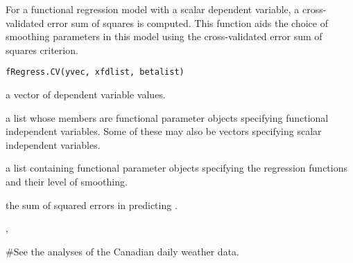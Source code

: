 \begin{Description}\relax
For a functional regression model with a scalar dependent variable,
a cross-validated error sum of squares is computed.  This function
aids the choice of smoothing parameters in this model using the
cross-validated error sum of squares criterion.
\end{Description}
\begin{Usage}
\begin{verbatim}
fRegress.CV(yvec, xfdlist, betalist)
\end{verbatim}
\end{Usage}
\begin{Arguments}
\begin{ldescription}
\item[\code{yvec}] a vector of dependent variable values.

\item[\code{xfdlist}] a list whose members are functional parameter objects
specifying functional independent variables.  Some
of these may also be vectors specifying scalar independent
variables.

\item[\code{betalist}] a list containing functional parameter objects specifying the
regression functions and their level of smoothing.

\end{ldescription}
\end{Arguments}
\begin{Value}
the sum of squared errors in predicting .
\end{Value}
\begin{SeeAlso}\relax
{}, 
\end{SeeAlso}
\begin{Examples}
\begin{ExampleCode}
#See the analyses of the Canadian daily weather data.
\end{ExampleCode}
\end{Examples}

